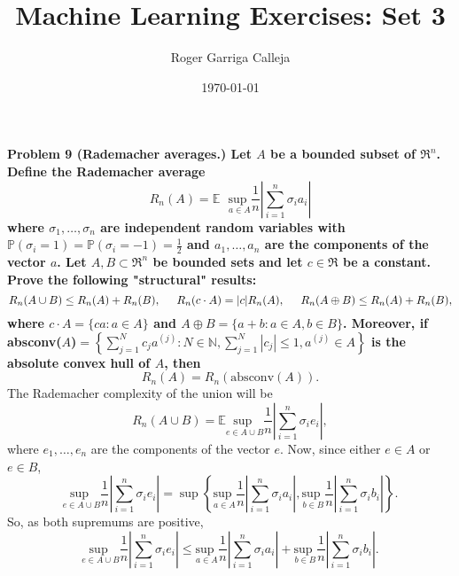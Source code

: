 \documentclass[11pt, english]{article}
\title{Machine Learning Exercises: Set 3}
\author{Roger Garriga Calleja}
\date{\today}
\newcommand{\su}[2]{\sum\limits_{#1}^{#2}}
\begin{document}
	\maketitle
\textbf{Problem 9 (Rademacher averages.) Let $A$ be a bounded subset of $\Re^n$. Define the Rademacher
average}
\begin{equation}
	R_n(A)=\mathbb{E}\text{ }\underset{a\in A}{\text{sup }}\frac{1}{n}\left|\su{i=1}{n}\sigma_ia_i\right|
\end{equation}
\textbf{where $\sigma_1,\dots,\sigma_n$ are independent random variables with $\mathbb{P}(\sigma_i=1)=\mathbb{P}(\sigma_i=-1)=\frac{1}{2}$ and $a_1,\dots,a_n$ are the components of the vector $a$. Let $A,B\subset\Re^n$ be bounded sets and let $c\in\Re$ be a constant. Prove the following "structural" results:}
\begin{equation}
	R_n(A\cup B)\leq R_n(A)+R_n(B),\hspace{0.5cm}R_n(c\cdot A)=|c|R_n(A),\hspace{0.5cm}R_n(A\oplus B)\leq R_n(A)+R_n(B),
\end{equation}
\textbf{where $c\cdot A=\{ca:a\in A\}$ and $A\oplus B=\{a+b:a\in A, b\in B\}$. Moreover, if absconv($A$)$=\left\{\su{j=1}{N}c_ja^{(j)}:N\in\mathbb{N},\su{j=1}{N}|c_j|\leq 1,a^{(j)}\in A\right\}$ is the absolute convex hull of $A$, then}
\begin{equation}
	R_n(A)=R_n(\text{absconv}(A)).
\end{equation}
The Rademacher complexity of the union will be 
\begin{equation}
	R_n(A\cup B)=\mathbb{E}\underset{e\in A\cup B}{\text{sup }}\frac{1}{n}\left|\su{i=1}{n}\sigma_i e_i\right|,
\end{equation}
where $e_1,\dots,e_n$ are the components of the vector $e$. Now, since either $e\in A$ or $e\in B$,
\begin{equation}
	\underset{e\in A\cup B}{\text{sup }}\frac{1}{n}\left|\su{i=1}{n}\sigma_i e_i\right|=\sup\left\{\underset{a\in A}{\text{sup }}\frac{1}{n}\left|\su{i=1}{n}\sigma_i a_i\right|,\underset{b\in B}{\text{sup }}\frac{1}{n}\left|\su{i=1}{n}\sigma_i b_i\right|\right\}.
\end{equation} 
So, as both supremums are positive,
\begin{equation}
	\underset{e\in A\cup B}{\text{sup }}\frac{1}{n}\left|\su{i=1}{n}\sigma_i e_i\right|\leq \underset{a\in A}{\text{sup }}\frac{1}{n}\left|\su{i=1}{n}\sigma_i a_i\right|+\underset{b\in B}{\text{sup }}\frac{1}{n}\left|\su{i=1}{n}\sigma_i b_i\right|.
\end{equation}
\end{document}
